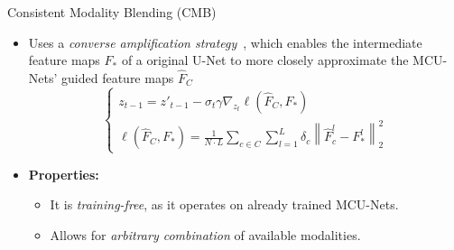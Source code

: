 \documentclass[pdf]{beamer}
\begin{document}
\begin{frame}{Consistent Modality Blending (CMB)}
    \begin{itemize}
        \item Uses a \textit{converse amplification strategy}~\cite{dhariwal2021diffusion}, which enables the intermediate feature maps $F_*$ of a original U-Net to more closely approximate the MCU-Nets' guided feature maps $\hat{F}_C$
        \[
        \begin{cases}
            z_{t-1} = z'_{t-1} - \sigma_t \gamma \nabla_{z_t} \ell(\hat{F}_C, F_*)
            \\
            \ell(\hat{F}_C, F_*) = \frac{1}{N \cdot L} \sum\limits_{c\in C} \sum\limits_{l=1}^{L} \delta_c \left\| \hat{F}_c^l - F_*^l \right\|_2^2
        \end{cases}
        \]
        \item \textbf{Properties:}
        \begin{itemize}
            \item It is \textit{training-free}, as it operates on already trained MCU-Nets.
            \item Allows for \textit{arbitrary combination} of available modalities.
        \end{itemize}
        
    \end{itemize}
\end{frame}
\end{document}
